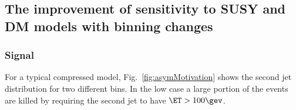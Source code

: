 \subsection{The improvement of sensitivity to SUSY and DM models with binning changes}

\subsubsection{Signal }\label{sec:asym_bin}

For a typical compressed model, Fig.~\ref{fig:asymMotivation} shows the second jet \PT
distribution for two different \HT bins. In the low \HT case a large portion of
the events are killed by requiring the second jet to have $\ET>100\gev$. 


